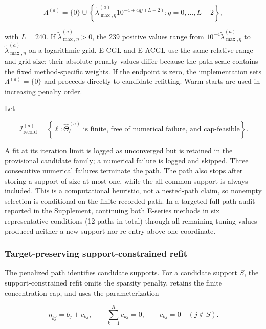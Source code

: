 \documentclass[preprint,12pt,authoryear]{elsarticle}
\begin{document}
\begin{equation}
\label{eq:lambda-path}
\Lambda^{(a)}
=\{0\}\cup
\left\{
\widetilde\lambda_{\max,\eta}^{(a)}
10^{-4+4q/(L-2)}:
q=0,\ldots,L-2
\right\},
\end{equation}

with $L=240$. If $\widetilde\lambda_{\max,\eta}^{(a)}>0$, the 239 positive
values range from
$10^{-4}\widetilde\lambda_{\max,\eta}^{(a)}$ to
$\widetilde\lambda_{\max,\eta}^{(a)}$ on a logarithmic grid. E-CGL and
E-ACGL use the same relative range and grid size; their absolute penalty
values differ because the path scale contains the fixed method-specific
weights. If the endpoint is zero, the implementation sets
$\Lambda^{(a)}=\{0\}$ and proceeds directly to candidate refitting. Warm starts
are used in increasing penalty order.

Let

\[
\mathcal I_{\mathrm{record}}^{(a)}
=\left\{\ell:
\widehat\Theta_{\ell}^{(a)}\text{ is finite, free of numerical failure, and cap-feasible}
\right\}.
\]

A fit at its iteration limit is logged as unconverged but is retained in the
provisional candidate family; a numerical failure is logged and skipped.
Three consecutive numerical failures terminate the path.
The path also stops after storing a support of size at most one, while the
all-common support is always included. This is a computational heuristic, not
a nested-path claim, so nonempty selection is conditional on the finite
recorded path. In a targeted full-path audit reported in the Supplement,
continuing both E-series methods in six representative conditions (12 paths
in total) through all remaining tuning values produced neither a new support
nor re-entry above one coordinate.

\subsubsection{Target-preserving support-constrained refit}

The penalized path identifies candidate supports. For a candidate support $S$,
the support-constrained refit omits the sparsity penalty, retains the finite
concentration cap, and uses the parameterization

\begin{equation}
\label{eq:refit-parameterization}
\eta_{kj}=b_j+c_{kj},
\qquad
\sum_{k=1}^K c_{kj}=0,
\qquad
c_{kj}=0\quad(j\notin S).
\end{equation}
\end{document}
